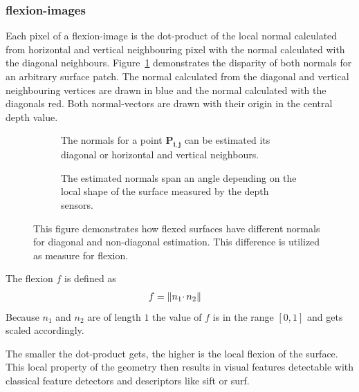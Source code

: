 \subsubsection{\Glspl{flexion-image}}\label{flexion-image-section}

Each pixel of a \Gls{flexion-image} is the dot-product of the local normal
calculated from horizontal and vertical neighbouring pixel with the
normal calculated with the diagonal neighbours.
Figure~\ref{fig:flexion-image-scetched} demonstrates the disparity of both normals for an arbitrary surface patch.
The normal calculated from the diagonal and vertical neighbouring vertices are drawn in blue and the normal calculated with the diagonals red.
Both normal-vectors are drawn with their origin in the central depth value.

\begin{figure}[H]
    \begin{subfigure}[t]{0.49\linewidth}
        \centering
        \scalebox{1.0}{%
        
        }
        \caption{The normals for a point $\mathbf{P_{i,j}}$ can be estimated its diagonal or horizontal and vertical neighbours.}
    \end{subfigure}
    \begin{subfigure}[t]{0.49\linewidth}
        \centering
        
        \caption{The estimated normals span an angle depending on the local shape of the surface measured by the depth sensors.}
    \end{subfigure}
    \caption[Schematic Representation of Flexion]{This figure demonstrates how flexed surfaces have different normals for diagonal and non-diagonal estimation. This difference is utilized as measure for flexion.}%
    \label{fig:flexion-image-scetched}
\end{figure}

The flexion $f$ is defined as
\begin{align}
    f &= \lVert n_1 \cdotp n_2\rVert
\end{align}
Because $n_1$ and $n_2$ are of length $1$ the value of $f$ is in the range $[0, 1]$ and gets scaled accordingly.

The smaller the dot-product gets, the higher is the local flexion of the
surface. This local property of the geometry then results in visual
features detectable with classical feature detectors and descriptors like
\Gls{sift} or \Gls{surf}.

